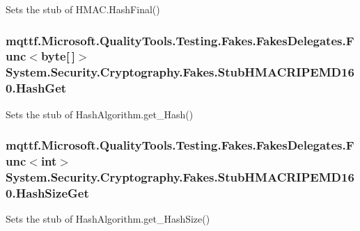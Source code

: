 Sets the stub of H\-M\-A\-C.\-Hash\-Final()

\hypertarget{class_system_1_1_security_1_1_cryptography_1_1_fakes_1_1_stub_h_m_a_c_r_i_p_e_m_d160_ab29d8cf2786afc02c0b4e6542428b3de}{
\subsubsection[{Hash\-Get}]{\setlength{\rightskip}{0pt plus 5cm}mqttf.\-Microsoft.\-Quality\-Tools.\-Testing.\-Fakes.\-Fakes\-Delegates.\-Func$<$byte\mbox{[}$\,$\mbox{]}$>$ System.\-Security.\-Cryptography.\-Fakes.\-Stub\-H\-M\-A\-C\-R\-I\-P\-E\-M\-D160.\-Hash\-Get}}\label{class_system_1_1_security_1_1_cryptography_1_1_fakes_1_1_stub_h_m_a_c_r_i_p_e_m_d160_ab29d8cf2786afc02c0b4e6542428b3de}


Sets the stub of Hash\-Algorithm.\-get\-\_\-\-Hash()

\hypertarget{class_system_1_1_security_1_1_cryptography_1_1_fakes_1_1_stub_h_m_a_c_r_i_p_e_m_d160_a716a0a76485953baeee3826b6919c3e6}{
\subsubsection[{Hash\-Size\-Get}]{\setlength{\rightskip}{0pt plus 5cm}mqttf.\-Microsoft.\-Quality\-Tools.\-Testing.\-Fakes.\-Fakes\-Delegates.\-Func$<$int$>$ System.\-Security.\-Cryptography.\-Fakes.\-Stub\-H\-M\-A\-C\-R\-I\-P\-E\-M\-D160.\-Hash\-Size\-Get}}\label{class_system_1_1_security_1_1_cryptography_1_1_fakes_1_1_stub_h_m_a_c_r_i_p_e_m_d160_a716a0a76485953baeee3826b6919c3e6}


Sets the stub of Hash\-Algorithm.\-get\-\_\-\-Hash\-Size()

